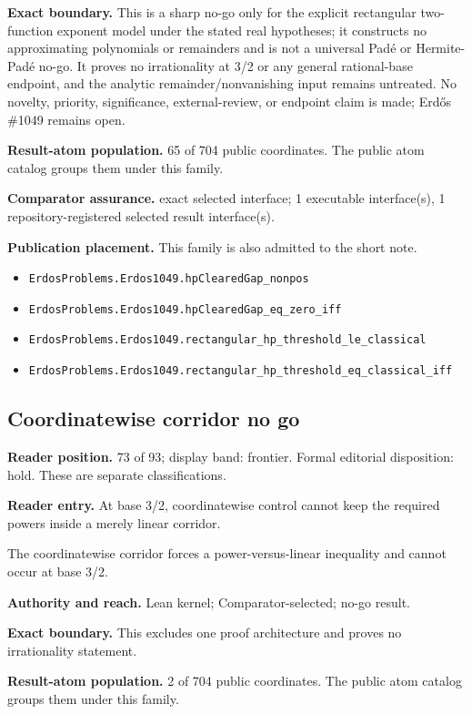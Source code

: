 \documentclass[11pt]{article}
\begin{document}
\textbf{Exact boundary.} This is a sharp no-go only for the explicit rectangular two-function exponent model under the stated real hypotheses; it constructs no approximating polynomials or remainders and is not a universal Padé or Hermite-Padé no-go. It proves no irrationality at 3/2 or any general rational-base endpoint, and the analytic remainder/nonvanishing input remains untreated. No novelty, priority, significance, external-review, or endpoint claim is made; Erdős \#1049 remains open.

\textbf{Result-atom population.} 65 of 704 public coordinates. The public atom catalog groups them under this family.

\textbf{Comparator assurance.} exact selected interface; 1 executable interface(s), 1 repository-registered selected result interface(s).

\textbf{Publication placement.} This family is also admitted to the short note.

\begin{itemize}
  \item \nolinkurl{ErdosProblems.Erdos1049.hpClearedGap_nonpos}
  \item \nolinkurl{ErdosProblems.Erdos1049.hpClearedGap_eq_zero_iff}
  \item \nolinkurl{ErdosProblems.Erdos1049.rectangular_hp_threshold_le_classical}
  \item \nolinkurl{ErdosProblems.Erdos1049.rectangular_hp_threshold_eq_classical_iff}
\end{itemize}

\subsection{Coordinatewise corridor no go}
\textbf{Reader position.} 73 of 93; display band: frontier.  Formal editorial disposition: hold.  These are separate classifications.

\textbf{Reader entry.} At base 3/2, coordinatewise control cannot keep the required powers inside a merely linear corridor.

The coordinatewise corridor forces a power-versus-linear inequality and cannot occur at base 3/2.

\textbf{Authority and reach.} Lean kernel; Comparator-selected; no-go result.

\textbf{Exact boundary.} This excludes one proof architecture and proves no irrationality statement.

\textbf{Result-atom population.} 2 of 704 public coordinates. The public atom catalog groups them under this family.
\end{document}
